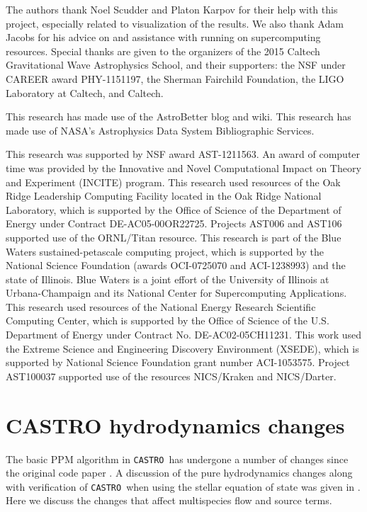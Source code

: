 \documentclass[iop]{../emulateapj}
\newcommand{\castro}{\texttt{CASTRO}}
\begin{document}
The authors thank Noel Scudder and Platon Karpov for their help with 
this project, especially related to visualization of the results. 
We also thank Adam Jacobs for his advice on and assistance with 
running on supercomputing resources. Special thanks are given 
to the organizers of the 2015 Caltech Gravitational Wave 
Astrophysics School, and their supporters: the NSF 
under CAREER award PHY-1151197, the Sherman Fairchild 
Foundation, the LIGO Laboratory at Caltech, and Caltech.

This research has made use of the AstroBetter blog and wiki. 
This research has made use of NASA's Astrophysics Data System 
Bibliographic Services.

This research was supported by NSF award AST-1211563. An
award of computer time was provided by the Innovative and Novel
Computational Impact on Theory and Experiment (INCITE) program.  This
research used resources of the Oak Ridge Leadership Computing Facility
located in the Oak Ridge National Laboratory, which is supported by
the Office of Science of the Department of Energy under Contract
DE-AC05-00OR22725. Projects AST006 and AST106 supported use of the ORNL/Titan resource. 
This research is part of the Blue Waters sustained-petascale computing project, 
which is supported by the National Science Foundation (awards OCI-0725070 
and ACI-1238993) and the state of Illinois. Blue Waters is a joint 
effort of the University of Illinois at Urbana-Champaign and its 
National Center for Supercomputing Applications.
This research used resources of the National Energy Research Scientific Computing
Center, which is supported by the Office of Science of the
U.S. Department of Energy under Contract No. DE-AC02-05CH11231.  
This work used the Extreme Science and Engineering Discovery Environment (XSEDE), 
which is supported by National Science Foundation grant number ACI-1053575. 
Project AST100037 supported use of the resources NICS/Kraken and NICS/Darter.

\clearpage

\appendix

\section{CASTRO hydrodynamics changes}

The basic PPM algorithm in \castro\ has undergone a number of changes
since the original code paper \citep{castro}.  A discussion of the
pure hydrodynamics changes along with verification of \castro\ when
using the stellar equation of state was given in
\citet{zingalekatz:2015}.  Here we discuss the changes that affect
multispecies flow and source terms.
\end{document}
